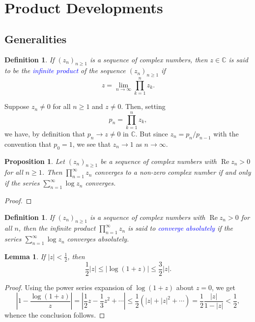 \documentclass[11pt]{article}
\theoremstyle{thmstyle}
\newtheorem{lemma}[theorem]{Lemma}
\newtheorem{proposition}[theorem]{Proposition}
\theoremstyle{defstyle}
\newtheorem{definition}[theorem]{Definition}
\newcommand{\bbC}{\mathbb{C}}
\newcommand{\define}[1]{\textcolor{blue}{\textit{#1}}}
\renewcommand{\le}{\leqslant}
\renewcommand{\ge}{\geqslant}
\renewcommand{\Re}{\operatorname{Re}}
\begin{document}
\section{Product Developments}

\subsection{Generalities}

\begin{definition}
    If $(z_n)_{n\ge 1}$ is a sequence of complex numbers, then $z\in\bbC$ is said to be the \define{infinite product} of the sequence $(z_n)_{n\ge 1}$ if 
    \begin{equation*}
        z = \lim_{n\to\infty}\prod_{k = 1}^n z_k.
    \end{equation*}
\end{definition}

Suppose $z_n\ne 0$ for all $n\ge 1$ and $z\ne 0$. Then, setting 
\begin{equation*}
    p_n = \prod_{k = 1}^n z_k,
\end{equation*}
we have, by definition that $p_n\to z\ne 0$ in $\bbC$. But since $z_n = p_n/p_{n - 1}$ with the convention that $p_0 = 1$, we see that $z_n\to 1$ as $n\to\infty$.

\begin{proposition}
    Let $(z_n)_{n\ge 1}$ be a sequence of complex numbers with $\Re z_n > 0$ for all $n\ge 1$. Then $\displaystyle\prod_{n = 1}^\infty z_n$ converges to a \emph{non-zero} complex number if and only if the series $\displaystyle\sum_{n = 1}^\infty\log z_n$ converges.
\end{proposition}
\begin{proof}
\end{proof}

\begin{definition}
    If $(z_n)_{n\ge 1}$ is a sequence of complex numbers with $\Re z_n > 0$ for all $n$, then the infinite product $\displaystyle\prod_{n = 1}^\infty z_n$ is said to \define{converge absolutely} if the series $\displaystyle\sum_{n = 1}^\infty\log z_n$ converges absolutely.
\end{definition}

\begin{lemma}
    If $|z| < \frac{1}{2}$, then 
    \begin{equation*}
        \frac{1}{2}|z|\le |\log (1 + z)|\le\frac{3}{2}|z|.
    \end{equation*}
\end{lemma}
\begin{proof}
    Using the power series expansion of $\log(1 + z)$ about $z = 0$, we get 
    \begin{equation*}
        \left|1 - \frac{\log(1 + z)}{z}\right| = \left|\frac{1}{2}z - \frac{1}{3}z^2 + \cdots\right|\le\frac{1}{2}\left(|z| + |z|^2 + \cdots\right) = \frac{1}{2}\frac{|z|}{1 - |z|} < \frac{1}{2},
    \end{equation*}
    whence the conclusion follows.
\end{proof}
\end{document}
